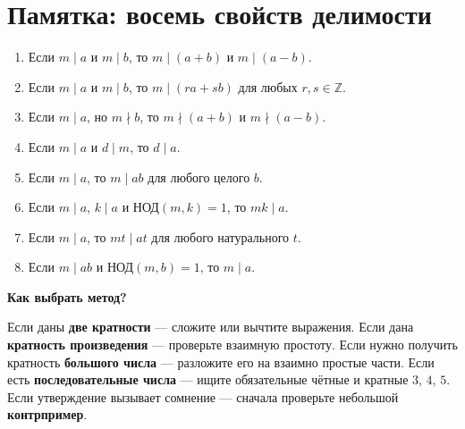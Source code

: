 \documentclass[11pt,a4paper]{article}
\begin{document}
\clearpage
\section*{Памятка: восемь свойств делимости}
\vspace{3mm}
\begin{enumerate}[label=\textbf{\arabic*.},leftmargin=8mm,itemsep=7pt]
\item Если $m\mid a$ и $m\mid b$, то $m\mid(a+b)$ и $m\mid(a-b)$.
\item Если $m\mid a$ и $m\mid b$, то $m\mid(ra+sb)$ для любых $r,s\in\mathbb Z$.
\item Если $m\mid a$, но $m\nmid b$, то $m\nmid(a+b)$ и $m\nmid(a-b)$.
\item Если $m\mid a$ и $d\mid m$, то $d\mid a$.
\item Если $m\mid a$, то $m\mid ab$ для любого целого $b$.
\item Если $m\mid a$, $k\mid a$ и $\text{НОД}(m,k)=1$, то $mk\mid a$.
\item Если $m\mid a$, то $mt\mid at$ для любого натурального $t$.
\item Если $m\mid ab$ и $\text{НОД}(m,b)=1$, то $m\mid a$.
\end{enumerate}
\vspace{8mm}
{\color{navy}\bfseries Как выбрать метод?}\par
Если даны \textbf{две кратности} --- сложите или вычтите выражения. Если дана \textbf{кратность произведения} --- проверьте взаимную простоту. Если нужно получить кратность \textbf{большого числа} --- разложите его на взаимно простые части. Если есть \textbf{последовательные числа} --- ищите обязательные чётные и кратные $3$, $4$, $5$. Если утверждение вызывает сомнение --- сначала проверьте небольшой \textbf{контрпример}.
\end{document}
